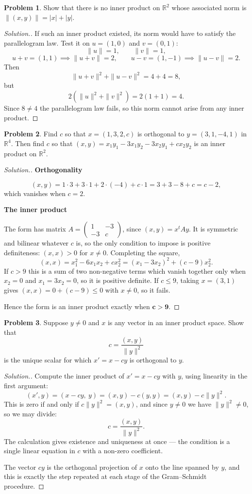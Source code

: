 \documentclass[11pt,a4paper]{article}
\theoremstyle{definition}
\newtheorem{problemx}{Problem}[section]
\newenvironment{problem}{\begin{problemx}}{\end{problemx}}
\newenvironment{solution}
  {\renewcommand{\qedsymbol}{}\begin{proof}[\textit{Solution}.]}
  {\end{proof}}
\newcommand{\subhead}[1]{%
  \par\medskip\noindent\textbf{#1}\par\nobreak\smallskip}
\begin{document}
\begin{problem}
Show that there is no inner product on $\mathbb{R}^2$ whose associated norm is
$\|(x,y)\|=|x|+|y|$.
\end{problem}
\begin{solution}
If such an inner product existed, its norm would have to satisfy the
parallelogram law. Test it on $u=(1,0)$ and $v=(0,1)$:
$$\|u\|=1,\qquad \|v\|=1,$$
$$u+v=(1,1)\implies \|u+v\|=2,\qquad u-v=(1,-1)\implies \|u-v\|=2.$$
Then
$$\|u+v\|^2+\|u-v\|^2=4+4=8,$$
but
$$2\left(\|u\|^2+\|v\|^2\right)=2(1+1)=4.$$
Since $8\neq 4$ the parallelogram law fails, so this norm cannot arise from any
inner product.
\end{solution}

\begin{problem}
Find $c$ so that $x=(1,3,2,c)$ is orthogonal to $y=(3,1,-4,1)$ in
$\mathbb{R}^4$. Then find $c$ so that
$(x,y)=x_1y_1-3x_1y_2-3x_2y_1+cx_2y_2$ is an inner product on $\mathbb{R}^2$.
\end{problem}
\begin{solution}
\subhead{Orthogonality}
$$(x,y)=1\cdot 3+3\cdot 1+2\cdot(-4)+c\cdot 1=3+3-8+c=c-2,$$
which vanishes when $c=2$.

\subhead{The inner product}
The form has matrix $A=\begin{pmatrix}1&-3\\-3&c\end{pmatrix}$, since
$(x,y)=x^tAy$. It is symmetric and bilinear whatever $c$ is, so the only
condition to impose is positive definiteness: $(x,x)>0$ for $x\neq 0$.
Completing the square,
$$(x,x)=x_1^2-6x_1x_2+cx_2^2=(x_1-3x_2)^2+(c-9)x_2^2.$$
If $c>9$ this is a sum of two non-negative terms which vanish together only
when $x_2=0$ and $x_1=3x_2=0$, so it is positive definite. If $c\leq 9$, taking
$x=(3,1)$ gives $(x,x)=0+(c-9)\leq 0$ with $x\neq 0$, so it fails.

Hence the form is an inner product exactly when $\boldsymbol{c>9}$.
\end{solution}

\begin{problem}
Suppose $y\neq 0$ and $x$ is any vector in an inner product space. Show that
$$c=\frac{(x,y)}{\|y\|^2}$$
is the unique scalar for which $x'=x-cy$ is orthogonal to $y$.
\end{problem}
\begin{solution}
Compute the inner product of $x'=x-cy$ with $y$, using linearity in the first
argument:
$$(x',y)=(x-cy,\ y)=(x,y)-c(y,y)=(x,y)-c\|y\|^2.$$
This is zero if and only if $c\|y\|^2=(x,y)$, and since $y\neq 0$ we have
$\|y\|^2\neq 0$, so we may divide:
$$c=\frac{(x,y)}{\|y\|^2}.$$
The calculation gives existence and uniqueness at once --- the condition is a
single linear equation in $c$ with a non-zero coefficient.

The vector $cy$ is the orthogonal projection of $x$ onto the line spanned by
$y$, and this is exactly the step repeated at each stage of the Gram--Schmidt
procedure.
\end{solution}
\end{document}
